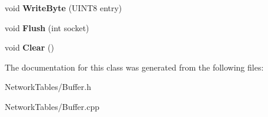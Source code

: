\begin{DoxyCompactItemize}
\item 
\hypertarget{classNetworkTables_1_1Buffer_a25d83f19de2ff625910eaff4b1fe4b7c}{
void {\bfseries WriteByte} (UINT8 entry)}
\label{classNetworkTables_1_1Buffer_a25d83f19de2ff625910eaff4b1fe4b7c}

\item 
\hypertarget{classNetworkTables_1_1Buffer_aafdd420dedb0dd930f9f8f9dfe60fd27}{
void {\bfseries Flush} (int socket)}
\label{classNetworkTables_1_1Buffer_aafdd420dedb0dd930f9f8f9dfe60fd27}

\item 
\hypertarget{classNetworkTables_1_1Buffer_a7e81f1f0121866a0a3b2a40460871d1c}{
void {\bfseries Clear} ()}
\label{classNetworkTables_1_1Buffer_a7e81f1f0121866a0a3b2a40460871d1c}

\end{DoxyCompactItemize}


The documentation for this class was generated from the following files:\begin{DoxyCompactItemize}
\item 
NetworkTables/Buffer.h\item 
NetworkTables/Buffer.cpp\end{DoxyCompactItemize}
